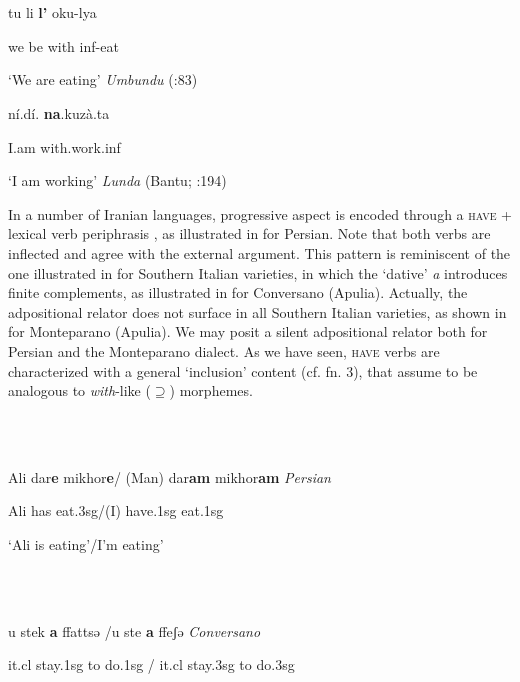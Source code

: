 \documentclass[output=paper,colorlinks,citecolor=brown]{./langscibook}
\begin{document}
\ea%
    \label{ex:key:13}
    \gll\\
        \\
    \glt
    \z

           tu   li   \textbf{l’}   oku-lya 

we  be  with  inf-eat

‘We are eating’  \textit{Umbundu}   (\citealt{HeineKuteva2002}:83)

   ní.dí.   \textbf{na}.kuzà.ta

I.am  with.work.inf     

‘I am working’     \textit{Lunda} (Bantu; \citealt{Kawasha2003}:194)

In a number of Iranian languages, progressive aspect is encoded through a \textsc{have} + lexical verb periphrasis \citep[556]{Cinque2017}, as illustrated in  for Persian. Note that both verbs are inflected and agree with the external argument. This pattern is reminiscent of the one illustrated in \citet{ManziniLorussoSavoia2017} for Southern Italian varieties, in which the ‘dative’ \textit{a} introduces finite complements, as illustrated in  for Conversano (Apulia). Actually, the adpositional relator does not surface in all Southern Italian varieties, as shown in  for Monteparano (Apulia). We may posit a silent adpositional relator \citep{Kayne2003} both for Persian and the Monteparano dialect. As we have seen, \textsc{have} verbs are characterized with a general ‘inclusion’ content (cf. fn. 3), that \citet{ManziniFranco2016} assume to be analogous to \textit{with}{}-like (${\supseteq}$) morphemes.

\ea%
    \label{ex:key:15}
    \gll\\
        \\
    \glt
    \z

           Ali dar\textbf{e} mikhor\textbf{e}/ (Man)   dar\textbf{am} mikhor\textbf{am}   \textit{Persian}

Ali has eat.3sg/(I)   have.1sg   eat.1sg

‘Ali is eating’/I’m eating’

\ea%
    \label{ex:key:16}
    \gll\\
        \\
    \glt
    \z

          u stek   \textbf{a}   ffattsə /u   ste   \textbf{a}  ffeʃə   \textit{Conversano} 

it.cl   stay.1sg to   do.1sg / it.cl   stay.3sg   to do.3sg
\end{document}
